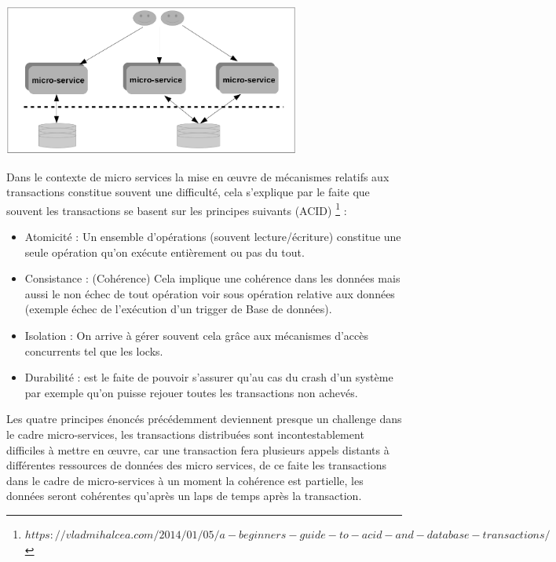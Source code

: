 \documentclass[12pt, a4paper, openany]{report}
\begin{document}
   \begin{center}
     \includegraphics[width=\textwidth, height=5cm]{decentra_db_25.png}
     \label{fig25}
   \end{center}
  
  Dans le contexte de micro services la mise en œuvre de mécanismes relatifs aux transactions constitue souvent une difficulté, cela s’explique par le faite que souvent les transactions se basent sur les principes suivants (ACID) \footnote{$https://vladmihalcea.com/2014/01/05/a-beginners-guide-to-acid-and-database-transactions/$} \cite{refbibAcid} : 
  
   \begin{itemize}
      \item Atomicité : Un ensemble d’opérations (souvent lecture/écriture) constitue une seule opération qu’on exécute entièrement ou pas du tout. 
      \item Consistance : (Cohérence) Cela implique une cohérence dans les données mais aussi le non échec de tout opération voir sous opération relative aux données (exemple échec de l’exécution d’un trigger de Base de données).
      \item Isolation : On arrive à gérer souvent cela grâce aux mécanismes d’accès concurrents tel que les locks.
      \item Durabilité : est le faite de pouvoir s’assurer qu’au cas du crash d’un système par exemple qu’on puisse rejouer toutes les transactions non achevés. 
   \end{itemize}
   
   Les quatre principes énoncés précédemment deviennent presque un challenge dans le cadre micro-services, les transactions distribuées sont incontestablement difficiles à mettre en œuvre, car une transaction fera plusieurs appels distants à différentes ressources de données des micro services, de ce faite les transactions dans le cadre de micro-services à un moment la cohérence est partielle, les données seront cohérentes qu’après un laps de temps après  la transaction.
   
\end{document}
